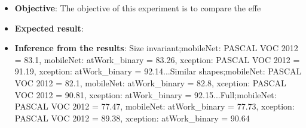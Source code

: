 	\begin{itemize}
		\item \textbf{Objective}: The objective of this experiment is to compare the effe
		\item \textbf{Expected result}:
		\item \textbf{Inference from the results}: Size invariant;mobileNet: PASCAL VOC 2012 = 83.1, mobileNet: atWork\_binary = 83.26, xception: PASCAL VOC 2012 = 91.19, xception: atWork\_binary = 92.14...Similar shapes;mobileNet: PASCAL VOC 2012 = 82.1, mobileNet: atWork\_binary = 82.8, xception: PASCAL VOC 2012 = 90.81, xception: atWork\_binary = 92.15...Full;mobileNet: PASCAL VOC 2012 = 77.47, mobileNet: atWork\_binary = 77.73, xception: PASCAL VOC 2012 = 89.38, xception: atWork\_binary = 90.64
	\end{itemize}
	
